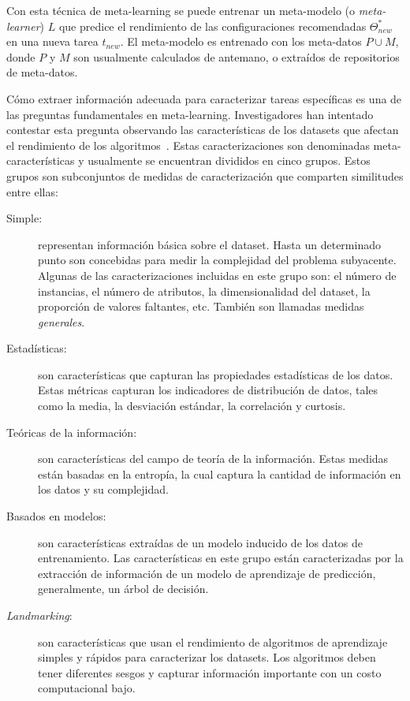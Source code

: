 \documentclass[a4paper,12pt]{article}
\begin{document}
Con esta técnica de meta-learning se puede entrenar un meta-modelo (o \textit{meta-learner}) $L$ que predice el rendimiento de las configuraciones recomendadas $\Theta^*_{new}$ en una nueva tarea $t_{new}$. El meta-modelo es entrenado con los meta-datos $P\cup M$, donde $P$ y $M$ son usualmente calculados de antemano, o extraídos de repositorios de meta-datos.

Cómo extraer información adecuada para caracterizar tareas específicas es una de las preguntas fundamentales en meta-learning. Investigadores han intentado contestar esta pregunta observando las características de los datasets que afectan el rendimiento de los algoritmos~\cite{Rivolli2018TowardsRE}. Estas caracterizaciones son denominadas meta-características y usualmente se encuentran divididos en cinco grupos. Estos grupos son subconjuntos de medidas de caracterización \cite{bradzil2009metalearning} que comparten similitudes entre ellas:

\begin{description}
	\item[Simple:] representan información básica sobre el dataset. Hasta un determinado punto son concebidas para medir la complejidad del problema subyacente. Algunas de las caracterizaciones incluidas en este grupo son: el número de instancias, el número de atributos, la dimensionalidad del dataset, la proporción de valores faltantes, etc. También son llamadas medidas \textit{generales}.
	
	\item[Estadísticas:] son características que capturan las propiedades estadísticas de los datos. Estas métricas capturan los indicadores de distribución de datos, tales como la media, la desviación estándar, la correlación y curtosis.
	
	\item[Teóricas de la información:] son características del campo de teoría de la información. Estas medidas están basadas en la entropía, la cual captura la cantidad de información en los datos y su complejidad.
	
	\item[Basados en modelos:] son características extraídas de un modelo inducido de los datos de entrenamiento. Las características en este grupo están caracterizadas por la extracción de información de un modelo de aprendizaje de predicción, generalmente, un árbol de decisión.
	
	\item[\textit{Landmarking}:] son características que usan el rendimiento de algoritmos de aprendizaje simples y rápidos para caracterizar los datasets. Los algoritmos deben tener diferentes sesgos y capturar información importante con un costo computacional bajo.
\end{description}
\end{document}

